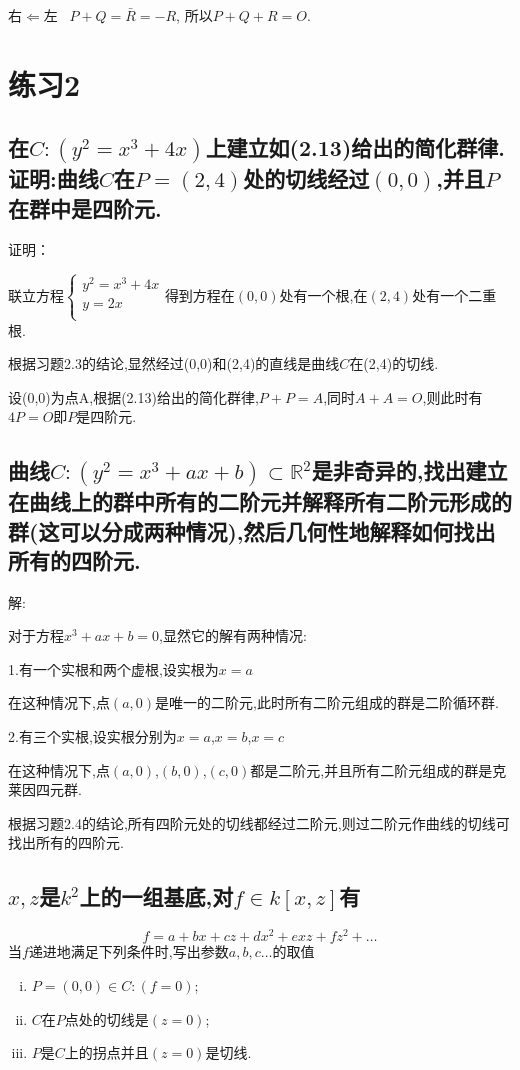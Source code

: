 \documentclass[UTF8]{book}
\begin{document}
		右$\Leftarrow$左 \ $P+Q=\bar{R}=-R$, 所以$ P+Q+R=O $.

	\section*{练习2}
		\subsection{在$C:\left(y^{2}=x^{3}+4 x\right)$上建立如(2.13)给出的简化群律.证明:曲线$ C $在$ P = (2,4) $处的切线经过$ (0,0) $,并且$ P $在群中是四阶元.}
			证明：
			
			
			联立方程$
			\left\{
			\begin{aligned}
			y^{2}=x^{3}+4 x \\
			y = 2x\\
			\end{aligned}
			\right.
			$得到方程在$ (0,0) $处有一个根,在$ (2,4) $处有一个二重根.
			
			
			根据习题2.3的结论,显然经过(0,0)和(2,4)的直线是曲线$ C $在(2,4)的切线.
			
			
			设(0,0)为点A,根据(2.13)给出的简化群律,$ P + P =  A$,同时$ A+A = O $,则此时有$ 4P = O $即$ P $是四阶元.
			
		\subsection{曲线$C:\left(y^{2}=x^{3}+ax+b\right) \subset \mathbb{R}^{2}$是非奇异的,找出建立在曲线上的群中所有的二阶元并解释所有二阶元形成的群(这可以分成两种情况),然后几何性地解释如何找出所有的四阶元.}
			
			解:
			
			
			对于方程$ x^{3}+ax+b = 0 $,显然它的解有两种情况:
			
			
			1.有一个实根和两个虚根,设实根为$ x = a $
			
			
			在这种情况下,点$ (a,0) $是唯一的二阶元,此时所有二阶元组成的群是二阶循环群.
			
			
			2.有三个实根,设实根分别为$ x = a $,$ x = b $,$ x = c $
			
			
			在这种情况下,点$ (a,0) $,$ (b,0) $,$ (c,0) $都是二阶元,并且所有二阶元组成的群是克莱因四元群.
			
			
			根据习题2.4的结论,所有四阶元处的切线都经过二阶元,则过二阶元作曲线的切线可找出所有的四阶元.
			
		\subsection{$ x,z $是$ k^{2} $上的一组基底,对$f \in k[x, z]$有}
			\begin{equation*}
			f=a+b x+c z+d x^{2}+e x z+f z^{2}+\ldots
			\end{equation*}
			当$ f $递进地满足下列条件时,写出参数$ a,b,c \ldots $的取值
			\begin{enumerate}[(i)]
				\item $P=(0,0) \in C:(f=0)$;
				\item $ C $在$ P $点处的切线是$ (z = 0) $;
				\item $ P $是$ C $上的拐点并且$ (z = 0) $是切线.
			\end{enumerate}
		
\end{document}
